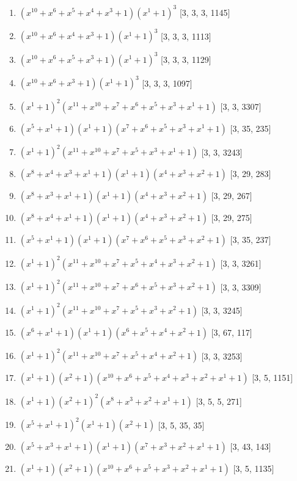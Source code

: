 \documentclass[10pt,twocolumn]{article}
\begin{document}
\begin{enumerate}
\item $(x^{10} + x^{6} + x^{5} + x^{4} + x^{3} + 1)(x^{1} + 1)^{3}$  [3, 3, 3, 1145]
\item $(x^{10} + x^{6} + x^{4} + x^{3} + 1)(x^{1} + 1)^{3}$  [3, 3, 3, 1113]
\item $(x^{10} + x^{6} + x^{5} + x^{3} + 1)(x^{1} + 1)^{3}$  [3, 3, 3, 1129]
\item $(x^{10} + x^{6} + x^{3} + 1)(x^{1} + 1)^{3}$  [3, 3, 3, 1097]
\item $(x^{1} + 1)^{2}(x^{11} + x^{10} + x^{7} + x^{6} + x^{5} + x^{3} + x^{1} + 1)$  [3, 3, 3307]
\item $(x^{5} + x^{1} + 1)(x^{1} + 1)(x^{7} + x^{6} + x^{5} + x^{3} + x^{1} + 1)$  [3, 35, 235]
\item $(x^{1} + 1)^{2}(x^{11} + x^{10} + x^{7} + x^{5} + x^{3} + x^{1} + 1)$  [3, 3, 3243]
\item $(x^{8} + x^{4} + x^{3} + x^{1} + 1)(x^{1} + 1)(x^{4} + x^{3} + x^{2} + 1)$  [3, 29, 283]
\item $(x^{8} + x^{3} + x^{1} + 1)(x^{1} + 1)(x^{4} + x^{3} + x^{2} + 1)$  [3, 29, 267]
\item $(x^{8} + x^{4} + x^{1} + 1)(x^{1} + 1)(x^{4} + x^{3} + x^{2} + 1)$  [3, 29, 275]
\item $(x^{5} + x^{1} + 1)(x^{1} + 1)(x^{7} + x^{6} + x^{5} + x^{3} + x^{2} + 1)$  [3, 35, 237]
\item $(x^{1} + 1)^{2}(x^{11} + x^{10} + x^{7} + x^{5} + x^{4} + x^{3} + x^{2} + 1)$  [3, 3, 3261]
\item $(x^{1} + 1)^{2}(x^{11} + x^{10} + x^{7} + x^{6} + x^{5} + x^{3} + x^{2} + 1)$  [3, 3, 3309]
\item $(x^{1} + 1)^{2}(x^{11} + x^{10} + x^{7} + x^{5} + x^{3} + x^{2} + 1)$  [3, 3, 3245]
\item $(x^{6} + x^{1} + 1)(x^{1} + 1)(x^{6} + x^{5} + x^{4} + x^{2} + 1)$  [3, 67, 117]
\item $(x^{1} + 1)^{2}(x^{11} + x^{10} + x^{7} + x^{5} + x^{4} + x^{2} + 1)$  [3, 3, 3253]
\item $(x^{1} + 1)(x^{2} + 1)(x^{10} + x^{6} + x^{5} + x^{4} + x^{3} + x^{2} + x^{1} + 1)$  [3, 5, 1151]
\item $(x^{1} + 1)(x^{2} + 1)^{2}(x^{8} + x^{3} + x^{2} + x^{1} + 1)$  [3, 5, 5, 271]
\item $(x^{5} + x^{1} + 1)^{2}(x^{1} + 1)(x^{2} + 1)$  [3, 5, 35, 35]
\item $(x^{5} + x^{3} + x^{1} + 1)(x^{1} + 1)(x^{7} + x^{3} + x^{2} + x^{1} + 1)$  [3, 43, 143]
\item $(x^{1} + 1)(x^{2} + 1)(x^{10} + x^{6} + x^{5} + x^{3} + x^{2} + x^{1} + 1)$  [3, 5, 1135]

\end{enumerate}
\end{document}
